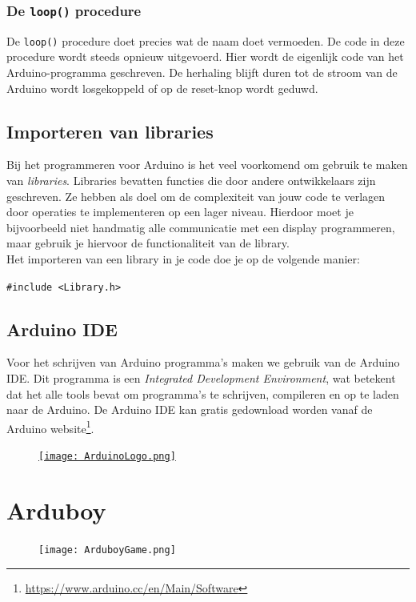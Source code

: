 \documentclass[11pt,fleqn]{book} %
\begin{document}
\subsection{De \texttt{loop()} procedure}
De \texttt{loop()} procedure doet precies wat de naam doet vermoeden. De code in deze procedure wordt steeds opnieuw uitgevoerd. Hier wordt de eigenlijk code van het Arduino-programma geschreven. De herhaling blijft duren tot de stroom van de Arduino wordt losgekoppeld of op de reset-knop wordt geduwd.

\section{Importeren van libraries}
Bij het programmeren voor Arduino is het veel voorkomend om gebruik te maken van \emph{libraries}. Libraries bevatten functies die door andere ontwikkelaars zijn geschreven. Ze hebben als doel om de complexiteit van jouw code te verlagen door operaties te implementeren op een lager niveau. Hierdoor moet je bijvoorbeeld niet handmatig alle communicatie met een display programmeren, maar gebruik je hiervoor de functionaliteit van de library.\\

\noindent
Het importeren van een library in je code doe je op de volgende manier:
\begin{center}
	\texttt{#include <Library.h>}
\end{center}

\section{Arduino IDE}
Voor het schrijven van Arduino programma's maken we gebruik van de Arduino IDE. Dit programma is een \emph{Integrated Development Environment}, wat betekent dat het alle tools bevat om programma's te schrijven, compileren en op te laden naar de Arduino. De Arduino IDE kan gratis gedownload worden vanaf de Arduino website\footnote{\url{https://www.arduino.cc/en/Main/Software}}.

\begin{figure}[!h]
	\centering
	\href{https://www.arduino.cc/en/Main/Software}{
		\texttt{[image: ArduinoLogo.png]}
	}
\end{figure}

\chapter{Arduboy}
\begin{figure}[!h]
	\centering
	\texttt{[image: ArduboyGame.png]}
\end{figure}
\end{document}
